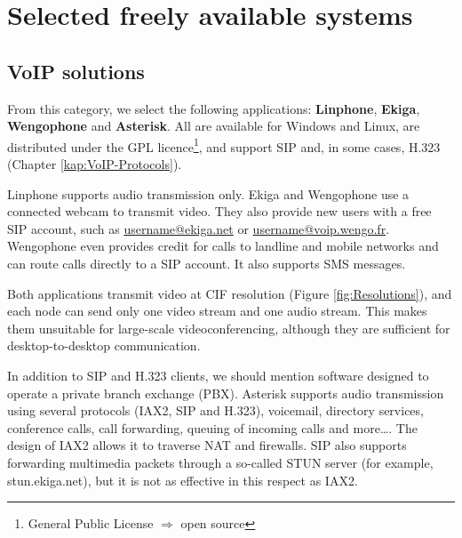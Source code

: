 \section{Selected freely available systems}

\subsection{VoIP solutions}\label{kap:VoIP-Software}
From this category, we select the following applications: \textbf{Linphone}, \textbf{Ekiga}, \textbf{Wengophone} and \textbf{Asterisk}. All are available for Windows and Linux, are distributed under the GPL licence\footnote{General Public License $\Rightarrow$ open source}, and support SIP and, in some cases, H.323 (Chapter \ref{kap:VoIP-Protocols}).

Linphone supports audio transmission only. Ekiga and Wengophone use a connected webcam to transmit video. They also provide new users with a free SIP account, such as \url{username@ekiga.net} or \url{username@voip.wengo.fr}. Wengophone even provides credit for calls to landline and mobile networks and can route calls directly to a SIP account. It also supports SMS messages.

Both applications transmit video at CIF resolution (Figure \ref{fig:Resolutions}), and each node can send only one video stream and one audio stream. This makes them unsuitable for large-scale videoconferencing, although they are sufficient for desktop-to-desktop communication.

In addition to SIP and H.323 clients, we should mention software designed to operate a private branch exchange (PBX). Asterisk supports audio transmission using several protocols (IAX2, SIP and H.323), voicemail, directory services, conference calls, call forwarding, queuing of incoming calls and more\ldots. The design of IAX2 allows it to traverse NAT and firewalls. SIP also supports forwarding multimedia packets through a so-called STUN server (for example, stun.ekiga.net), but it is not as effective in this respect as IAX2.


